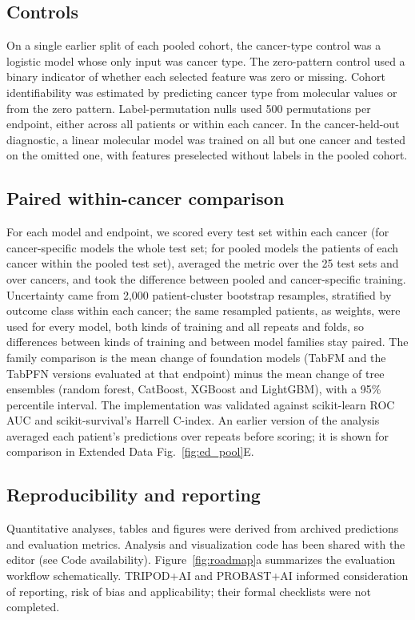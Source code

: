 \documentclass[pdflatex,sn-nature]{sn-jnl}
\begin{document}
\subsection*{Controls}
On a single earlier split of each pooled cohort, the cancer-type control was a logistic model whose only input was cancer type. The zero-pattern control used a binary indicator of whether each selected feature was zero or missing. Cohort identifiability was estimated by predicting cancer type from molecular values or from the zero pattern. Label-permutation nulls used 500 permutations per endpoint, either across all patients or within each cancer. In the cancer-held-out diagnostic, a linear molecular model was trained on all but one cancer and tested on the omitted one, with features preselected without labels in the pooled cohort.

\subsection*{Paired within-cancer comparison}
For each model and endpoint, we scored every test set within each cancer (for cancer-specific models the whole test set; for pooled models the patients of each cancer within the pooled test set), averaged the metric over the 25 test sets and over cancers, and took the difference between pooled and cancer-specific training. Uncertainty came from 2,000 patient-cluster bootstrap resamples, stratified by outcome class within each cancer; the same resampled patients, as weights, were used for every model, both kinds of training and all repeats and folds, so differences between kinds of training and between model families stay paired. The family comparison is the mean change of foundation models (TabFM and the TabPFN versions evaluated at that endpoint) minus the mean change of tree ensembles (random forest, CatBoost, XGBoost and LightGBM), with a 95\% percentile interval. The implementation was validated against scikit-learn ROC AUC and scikit-survival's Harrell C-index. An earlier version of the analysis averaged each patient's predictions over repeats before scoring; it is shown for comparison in Extended Data Fig.~\ref{fig:ed_pool}E.

\subsection*{Reproducibility and reporting}
Quantitative analyses, tables and figures were derived from archived predictions and evaluation metrics. Analysis and visualization code has been shared with the editor (see Code availability). Figure~\ref{fig:roadmap}a summarizes the evaluation workflow schematically. TRIPOD+AI and PROBAST+AI informed consideration of reporting, risk of bias and applicability; their formal checklists were not completed.\citep{tripodai2024,probastai2024}
\end{document}
